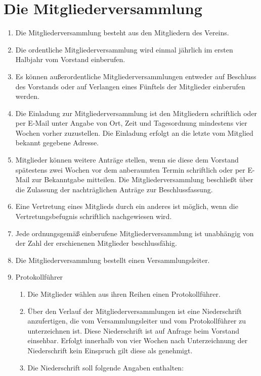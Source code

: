 \documentclass[a4paper, 12pt]{scrartcl}
\begin{document}
\section{Die Mitgliederversammlung}
\label{die-mv}
\begin{enumerate}
	\item Die Mitgliederversammlung besteht aus den Mitgliedern des Vereins.
	\item Die ordentliche Mitgliederversammlung wird einmal jährlich im ersten Halbjahr vom Vorstand einberufen.
	\item Es können außerordentliche Mitgliederversammlungen entweder auf Beschluss des Vorstands oder auf Verlangen eines Fünftels der Mitglieder einberufen werden.
	\item \label{mv-einladung} Die Einladung zur Mitgliederversammlung ist den Mitgliedern schriftlich oder per E-Mail unter Angabe von Ort, Zeit und Tagesordnung mindestens vier Wochen vorher zuzustellen. Die Einladung erfolgt an die letzte vom Mitglied bekannt gegebene Adresse.
	\item \label{mv-nachtrag} Mitglieder können weitere Anträge stellen, wenn sie diese dem Vorstand spätestens zwei Wochen vor dem anberaumten Termin schriftlich oder per E-Mail zur Bekanntgabe mitteilen. Die Mitgliederversammlung beschließt über die Zulassung der nachträglichen Anträge zur Beschlussfassung.
	\item Eine Vertretung eines Mitglieds durch ein anderes ist möglich, wenn die Vertretungsbefugnis schriftlich nachgewiesen wird.
	\item Jede ordnungsgemäß einberufene Mitgliederversammlung ist unabhängig von der Zahl der erschienenen Mitglieder beschlussfähig.
	\item Die Mitgliederversammlung bestellt einen Versammlungsleiter.
	\item{Protokollführer}
		\begin{enumerate}
			\item Die Mitglieder wählen aus ihren Reihen einen Protokollführer.
			\item Über den Verlauf der Mitgliederversammlungen ist eine Niederschrift anzufertigen, die vom Versammlungsleiter und vom Protokollführer zu unterzeichnen ist. Diese Niederschrift ist auf Anfrage beim Vorstand einsehbar. Erfolgt innerhalb von vier Wochen nach Unterzeichnung der Niederschrift kein Einspruch gilt diese als genehmigt.
			\item Die Niederschrift soll folgende Angaben enthalten:
			\begin{enumerate}

\end{enumerate}
\end{enumerate}
\end{enumerate}
\end{document}
